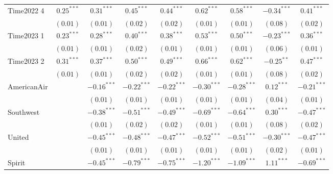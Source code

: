 \begin{table}
\begin{center}
\begin{tabular}{l c c c c c c c c}
Time2022 4                   & $0.25^{***}$  & $0.31^{***}$  & $0.45^{***}$  & $0.44^{***}$  & $0.62^{***}$  & $0.58^{***}$  & $-0.34^{***}$ & $0.41^{***}$  \\
                             & $(0.01)$      & $(0.01)$      & $(0.02)$      & $(0.02)$      & $(0.01)$      & $(0.01)$      & $(0.08)$      & $(0.02)$      \\
Time2023 1                   & $0.23^{***}$  & $0.28^{***}$  & $0.40^{***}$  & $0.38^{***}$  & $0.53^{***}$  & $0.50^{***}$  & $-0.23^{***}$ & $0.36^{***}$  \\
                             & $(0.01)$      & $(0.01)$      & $(0.02)$      & $(0.01)$      & $(0.01)$      & $(0.01)$      & $(0.06)$      & $(0.01)$      \\
Time2023 2                   & $0.31^{***}$  & $0.37^{***}$  & $0.50^{***}$  & $0.49^{***}$  & $0.66^{***}$  & $0.62^{***}$  & $-0.25^{**}$  & $0.47^{***}$  \\
                             & $(0.01)$      & $(0.01)$      & $(0.02)$      & $(0.02)$      & $(0.01)$      & $(0.01)$      & $(0.08)$      & $(0.02)$      \\
AmericanAir                  &               & $-0.16^{***}$ & $-0.22^{***}$ & $-0.22^{***}$ & $-0.30^{***}$ & $-0.28^{***}$ & $0.12^{***}$  & $-0.21^{***}$ \\
                             &               & $(0.01)$      & $(0.01)$      & $(0.01)$      & $(0.01)$      & $(0.01)$      & $(0.04)$      & $(0.01)$      \\
Southwest                    &               & $-0.38^{***}$ & $-0.51^{***}$ & $-0.49^{***}$ & $-0.69^{***}$ & $-0.64^{***}$ & $0.30^{***}$  & $-0.47^{***}$ \\
                             &               & $(0.01)$      & $(0.02)$      & $(0.02)$      & $(0.01)$      & $(0.01)$      & $(0.08)$      & $(0.02)$      \\
United                       &               & $-0.45^{***}$ & $-0.48^{***}$ & $-0.47^{***}$ & $-0.52^{***}$ & $-0.51^{***}$ & $-0.30^{***}$ & $-0.47^{***}$ \\
                             &               & $(0.01)$      & $(0.01)$      & $(0.01)$      & $(0.01)$      & $(0.01)$      & $(0.02)$      & $(0.01)$      \\
Spirit                       &               & $-0.45^{***}$ & $-0.79^{***}$ & $-0.75^{***}$ & $-1.20^{***}$ & $-1.09^{***}$ & $1.11^{***}$  & $-0.69^{***}$ \\

\end{tabular}
\end{center}
\end{table}
